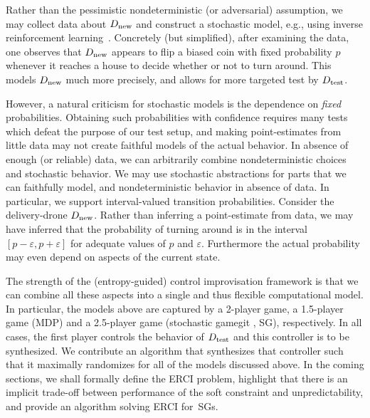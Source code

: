 Rather than the pessimistic nondeterministic (or adversarial)  assumption, we may collect data about ${D_{\text{new}}}$ and construct a stochastic model, e.g., using inverse reinforcement learning~\cite{DBLP:conf/icml/NgR00}.
Concretely (but simplified), after examining the data, one observes that ${D_{\text{new}}}$ appears
to flip a biased coin with fixed probability $p$ whenever it reaches a house to decide whether or
not to turn around. 
This models ${D_{\text{new}}}$ much more precisely, and allows for more targeted test by ${D_{\text{test}}}$.


 However, a natural criticism for stochastic
models is the dependence on \emph{fixed} probabilities. 
Obtaining such probabilities with confidence requires many tests which defeat the purpose of our test setup, and making point-estimates from little data may not create faithful models of the actual behavior.
  In absence of enough (or reliable) data, we can arbitrarily combine
nondeterministic choices and stochastic behavior. We may use stochastic abstractions for parts that we can faithfully model, and nondeterministic behavior in absence of data.
In particular, we
support interval-valued transition probabilities.  Consider the
delivery-drone ${D_{\text{new}}}$. Rather than inferring a point-estimate
from data, we may have inferred that the probability of turning around
is in the interval $[p - \varepsilon, p + \varepsilon]$ for adequate
values of $p$ and $\varepsilon$.  Furthermore the actual probability
may even depend on aspects of the current state.

The strength of the (entropy-guided) control improvisation framework
is that we can combine all these aspects into a single and thus flexible 
computational model. 
In particular, the models above are captured by a 2-player game, a 1.5-player game (MDP) and a 2.5-player game (stochastic gamegit , SG), respectively.
In all cases, the first player controls the behavior of ${D_{\text{test}}}$ and this controller is to be synthesized. 
We contribute an algorithm that synthesizes that controller such that
it  maximally randomizes for all of the models discussed above. In the
coming sections, we shall formally define the ERCI problem, highlight
that there is an implicit trade-off between performance of the soft
constraint and unpredictability, and provide an algorithm solving ERCI
for~SGs.

